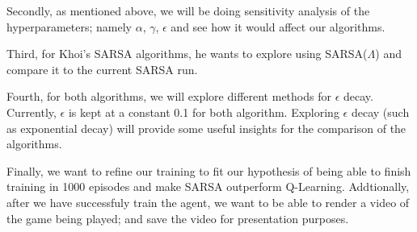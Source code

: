 \documentclass[nohyperref]{article}
\theoremstyle{plain}
\theoremstyle{definition}
\theoremstyle{remark}
\newcommand{\cnote}[1]{\textsf{\color{blue} [#1]}}
\begin{document}
Secondly, as mentioned above, we will be doing sensitivity analysis of the hyperparameters; namely $\alpha$, $\gamma$, $\epsilon$ and see how it would
affect our algorithms.

Third, for Khoi's SARSA algorithms, he wants to explore using SARSA($\Lambda$) and compare it to the current SARSA run. 

Fourth, for both algorithms, we will explore different methods for $\epsilon$ decay. Currently, $\epsilon$ is kept at a constant 0.1 for both algorithm.
Exploring $\epsilon$ decay (such as exponential decay) will provide some useful insights for the comparison of the algorithms.

Finally, we want to refine our training to fit our hypothesis of being able to finish training in 1000 episodes and make SARSA outperform Q-Learning.
Addtionally, after we have successfuly train the agent, we want to be able to render a video of the game being played; and save the video for presentation purposes.



\end{document}
